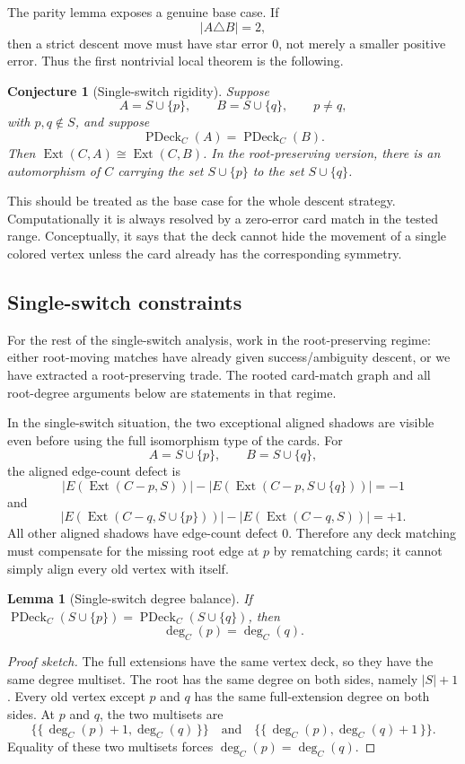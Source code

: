 \documentclass[11pt]{article}
\newtheorem{lemma}{Lemma}
\newtheorem{conjecture}{Conjecture}
\newcommand{\PDeck}{\operatorname{PDeck}}
\newcommand{\Ext}{\operatorname{Ext}}
\begin{document}
The parity lemma exposes a genuine base case.  If
\[
  |A\triangle B|=2,
\]
then a strict descent move must have star error \(0\), not merely a smaller
positive error.  Thus the first nontrivial local theorem is the following.

\begin{conjecture}[Single-switch rigidity]
Suppose
\[
  A=S\cup\{p\},
  \qquad
  B=S\cup\{q\},
  \qquad
  p\neq q,
\]
with \(p,q\notin S\), and suppose
\[
  \PDeck_C(A)=\PDeck_C(B).
\]
Then \(\Ext(C,A)\cong\Ext(C,B)\).  In the root-preserving version, there is
an automorphism of \(C\) carrying the set \(S\cup\{p\}\) to the set
\(S\cup\{q\}\).
\end{conjecture}

This should be treated as the base case for the whole descent strategy.
Computationally it is always resolved by a zero-error card match in the tested
range.  Conceptually, it says that the deck cannot hide the movement of a
single colored vertex unless the card already has the corresponding symmetry.

\subsection{Single-switch constraints}

For the rest of the single-switch analysis, work in the root-preserving
regime: either root-moving matches have already given success/ambiguity
descent, or we have extracted a root-preserving trade.  The rooted card-match
graph and all root-degree arguments below are statements in that regime.

In the single-switch situation, the two exceptional aligned shadows are
visible even before using the full isomorphism type of the cards.  For
\[
  A=S\cup\{p\},
  \qquad
  B=S\cup\{q\},
\]
the aligned edge-count defect is
\[
  |E(\Ext(C-p,S))|-|E(\Ext(C-p,S\cup\{q\}))|=-1
\]
and
\[
  |E(\Ext(C-q,S\cup\{p\}))|-|E(\Ext(C-q,S))|=+1.
\]
All other aligned shadows have edge-count defect \(0\).  Therefore any deck
matching must compensate for the missing root edge at \(p\) by rematching
cards; it cannot simply align every old vertex with itself.

\begin{lemma}[Single-switch degree balance]
If \(\PDeck_C(S\cup\{p\})=\PDeck_C(S\cup\{q\})\), then
\[
  \deg_C(p)=\deg_C(q).
\]
\end{lemma}

\begin{proof}[Proof sketch]
The full extensions have the same vertex deck, so they have the same degree
multiset.  The root has the same degree on both sides, namely \(|S|+1\).
Every old vertex except \(p\) and \(q\) has the same full-extension degree on
both sides.  At \(p\) and \(q\), the two multisets are
\[
  \{\!\{\, \deg_C(p)+1,\deg_C(q) \,\}\!\}
  \quad\text{and}\quad
  \{\!\{\, \deg_C(p),\deg_C(q)+1 \,\}\!\}.
\]
Equality of these two multisets forces \(\deg_C(p)=\deg_C(q)\).
\end{proof}
\end{document}
